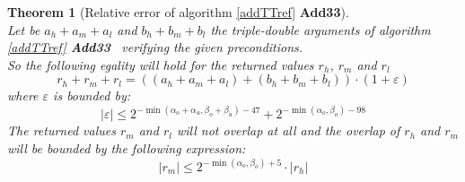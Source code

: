 \documentclass[a4paper,10pt,twoside]{article}
\newtheorem{theorem}{Theorem}[section]
\newcommand{\hi}{\ensuremath{\mathit{h}}}
\newcommand{\mi}{\ensuremath{\mathit{m}}}
\newcommand{\lo}{\ensuremath{\mathit{l}}}
\newcommand{\AddTT}{{\bf Add33}}
\renewcommand{\epsilon}{\varepsilon}
\begin{document}
\begin{theorem}[Relative error of algorithm \ref{addTTref} \AddTT\label{theoAddTT}] ~ \\
Let be $a_\hi + a_\mi + a_\lo$ and $b_\hi + b_\mi + b_\lo$ the triple-double
arguments of algorithm \ref{addTTref} \AddTT~ verifying the given
preconditions.\\
So the following egality will hold for the returned values $r_\hi$, $r_\mi$ and $r_\lo$
$$r_\hi + r_\mi + r_\lo = \left(\left(a_\hi + a_\mi + a_\lo \right) + \left( b_\hi + b_\mi + b_\lo \right)\right) \cdot \left(1 + \epsilon\right)$$
where $\epsilon$ is bounded by:
$$\left \vert \epsilon \right \vert \leq 2^{-\min\left(\alpha_o + \alpha_u,\beta_o + \beta_u\right) - 47} +
2^{-\min\left( \alpha_o, \beta_o\right) - 98}$$
The returned values $r_\mi$ and $r_\lo$ will not overlap at all and the
overlap of $r_\hi$ and $r_\mi$ will be bounded by the following expression:
$$\left \vert r_\mi \right \vert \leq 2^{-\min\left( \alpha_o, \beta_o \right) + 5} \cdot \left \vert r_\hi \right \vert$$
\end{theorem}
\end{document}
